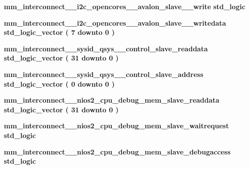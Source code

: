 \begin{DoxyCompactItemize}
\item 
{\bf mm\+\_\+interconnect\+\_\+\_\+i2c\+\_\+opencores\+\_\+\_\+avalon\+\_\+slave\+\_\+\_\+write} {\bfseries \textcolor{comment}{std\+\_\+logic}\textcolor{vhdlchar}{ }} 
\item 
{\bf mm\+\_\+interconnect\+\_\+\_\+i2c\+\_\+opencores\+\_\+\_\+avalon\+\_\+slave\+\_\+\_\+writedata} {\bfseries \textcolor{comment}{std\+\_\+logic\+\_\+vector}\textcolor{vhdlchar}{ }\textcolor{vhdlchar}{(}\textcolor{vhdlchar}{ }\textcolor{vhdlchar}{ } \textcolor{vhdldigit}{7} \textcolor{vhdlchar}{ }\textcolor{keywordflow}{downto}\textcolor{vhdlchar}{ }\textcolor{vhdlchar}{ } \textcolor{vhdldigit}{0} \textcolor{vhdlchar}{ }\textcolor{vhdlchar}{)}\textcolor{vhdlchar}{ }} 
\item 
{\bf mm\+\_\+interconnect\+\_\+\_\+sysid\+\_\+qsys\+\_\+\_\+control\+\_\+slave\+\_\+readdata} {\bfseries \textcolor{comment}{std\+\_\+logic\+\_\+vector}\textcolor{vhdlchar}{ }\textcolor{vhdlchar}{(}\textcolor{vhdlchar}{ }\textcolor{vhdlchar}{ } \textcolor{vhdldigit}{31} \textcolor{vhdlchar}{ }\textcolor{keywordflow}{downto}\textcolor{vhdlchar}{ }\textcolor{vhdlchar}{ } \textcolor{vhdldigit}{0} \textcolor{vhdlchar}{ }\textcolor{vhdlchar}{)}\textcolor{vhdlchar}{ }} 
\item 
{\bf mm\+\_\+interconnect\+\_\+\_\+sysid\+\_\+qsys\+\_\+\_\+control\+\_\+slave\+\_\+address} {\bfseries \textcolor{comment}{std\+\_\+logic\+\_\+vector}\textcolor{vhdlchar}{ }\textcolor{vhdlchar}{(}\textcolor{vhdlchar}{ }\textcolor{vhdlchar}{ } \textcolor{vhdldigit}{0} \textcolor{vhdlchar}{ }\textcolor{keywordflow}{downto}\textcolor{vhdlchar}{ }\textcolor{vhdlchar}{ } \textcolor{vhdldigit}{0} \textcolor{vhdlchar}{ }\textcolor{vhdlchar}{)}\textcolor{vhdlchar}{ }} 
\item 
{\bf mm\+\_\+interconnect\+\_\+\_\+nios2\+\_\+cpu\+\_\+debug\+\_\+mem\+\_\+slave\+\_\+readdata} {\bfseries \textcolor{comment}{std\+\_\+logic\+\_\+vector}\textcolor{vhdlchar}{ }\textcolor{vhdlchar}{(}\textcolor{vhdlchar}{ }\textcolor{vhdlchar}{ } \textcolor{vhdldigit}{31} \textcolor{vhdlchar}{ }\textcolor{keywordflow}{downto}\textcolor{vhdlchar}{ }\textcolor{vhdlchar}{ } \textcolor{vhdldigit}{0} \textcolor{vhdlchar}{ }\textcolor{vhdlchar}{)}\textcolor{vhdlchar}{ }} 
\item 
{\bf mm\+\_\+interconnect\+\_\+\_\+nios2\+\_\+cpu\+\_\+debug\+\_\+mem\+\_\+slave\+\_\+waitrequest} {\bfseries \textcolor{comment}{std\+\_\+logic}\textcolor{vhdlchar}{ }} 
\item 
{\bf mm\+\_\+interconnect\+\_\+\_\+nios2\+\_\+cpu\+\_\+debug\+\_\+mem\+\_\+slave\+\_\+debugaccess} {\bfseries \textcolor{comment}{std\+\_\+logic}\textcolor{vhdlchar}{ }} 

\end{DoxyCompactItemize}
